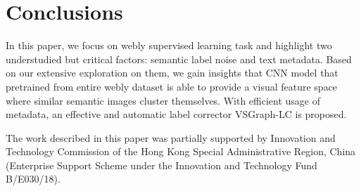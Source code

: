 \documentclass[sigconf]{acmart}
\begin{document}
\section{Conclusions}
In this paper, we focus on webly supervised learning task and highlight two understudied but critical factors: semantic label noise and text metadata.
Based on our extensive exploration on them, we gain insights that CNN model that pretrained from entire webly dataset is able to provide a visual feature space where similar semantic images cluster themselves. With efficient usage of metadata, an effective and automatic label corrector VSGraph-LC is proposed.


\begin{acks}
The work described in this paper was partially supported by Innovation and Technology Commission of the Hong Kong Special Administrative Region, China (Enterprise Support Scheme under the Innovation and Technology Fund B/E030/18).
\end{acks}
\newpage













	















\newpage
\appendix
\end{document}
